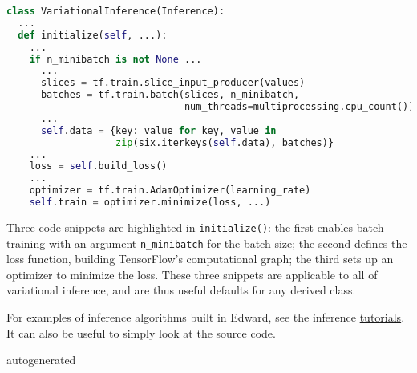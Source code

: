 \begin{lstlisting}[language=Python]
class VariationalInference(Inference):
  ...
  def initialize(self, ...):
    ...
    if n_minibatch is not None ...
      ...
      slices = tf.train.slice_input_producer(values)
      batches = tf.train.batch(slices, n_minibatch,
                               num_threads=multiprocessing.cpu_count())
      ...
      self.data = {key: value for key, value in
                   zip(six.iterkeys(self.data), batches)}
    ...
    loss = self.build_loss()
    ...
    optimizer = tf.train.AdamOptimizer(learning_rate)
    self.train = optimizer.minimize(loss, ...)
\end{lstlisting}

Three code snippets are highlighted in \texttt{initialize()}: the first
enables batch training with an argument \texttt{n_minibatch} for the batch
size; the second defines the loss function, building TensorFlow's
computational graph; the third sets up an optimizer to minimize the
loss. These three snippets are applicable to all of variational
inference, and are thus useful defaults for any derived class.

For examples of inference algorithms built in Edward, see the inference
\href{/tutorials/}{tutorials}. It can also be useful to simply look at
the
\href{https://github.com/blei-lab/edward/tree/master/edward/inferences}
{source code}.

{{autogenerated}}
